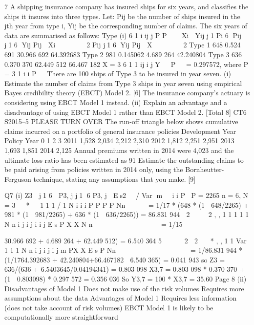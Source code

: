 \documentclass[a4paper,12pt]{article}
\begin{document}
\begin{enumerate}
7 A shipping insurance company has insured ships for six years, and classifies the
ships it insures into three types.
Let:
  Pij be the number of ships insured in the jth year from type i,
Yij be the corresponding number of claims.
The six years of data are summarised as follows:
  Type (i)
6
1
i ij
j
P P

  Xi 
Yij
j1 Pi
6
Pij
j1
6
Yij
Pij
 Xi






2
Pij
j1
6
Yij
Pij
 X






2
Type 1 648 0.524 691 30.966 692 64.392683
Type 2 981 0.145062 4.689 264 42.240804
Type 3 636 0.370 370 62.449 512 66.467 182
X =
  3 6
1 1
ij
i j
Y
  P
  = 0.297572, where P =
  3
1
i
i
P
 
There are 100 ships of Type 3 to be insured in year seven.
(i) Estimate the number of claims from Type 3 ships in year seven using
empirical Bayes credibility theory (EBCT) Model 2. [6]
The insurance company’s actuary is considering using EBCT Model 1 instead.
(ii) Explain an advantage and a disadvantage of using EBCT Model 1 rather
than EBCT Model 2. 
[Total 8]
CT6 S2015–5 PLEASE TURN OVER
 The run-off triangle below shows cumulative claims incurred on a portfolio of
general insurance policies
Development Year
Policy Year 0 1 2 3
2011 1,528 2,034 2,212 2,310
2012 1,812 2,251 2,951
2013 1,693 1,851
2014 2,125
Annual premiums written in 2014 were 4,023 and the ultimate loss ratio has been
estimated as 91%
Estimate the outstanding claims to be paid arising from policies written in 2014
only, using the Bornheutter-Ferguson technique, stating any assumptions that you
make. [9]


\newpage
Q7 (i) Z3  j1
6  P3, j
j1
6 P3, j  Es2 / Var m
i
i
P P = 2265
n = 6, N = 3
  *  
1
1 1 /
  1
N
i i
i
P P P P
Nn 
 
 
= 1/17 * (648 * (1  648/2265) + 981 * (1  981/2265) + 636 *
            (1  636/2265))
= 86.831 944
 2    2
, ,
1 1
1 1
1
N n
i j i j i
i j
E s P X X
N n  
         
 
= 1/15{30.966 692 + 4.689 264 + 62.449 512) = 6.540 364 5
    2  2  
* , ,
1 1
Var 1 1
1
N n
i j i j
i j
m PX X E s
P Nn  
           

= 1/86.831 944 * (1/17{64.392683 + 42.240804+66.467182}  6.540 365)
= 0.041 943
so Z3 = 636/(636 + 6.5403645/0.04194341) = 0.803 098
X3,7 = 0.803 098 * 0.370 370 + (1  0.803098) * 0.297 572 = 0.356 036
So Y3,7 = 100 * X3,7 = 35.60
Page 8
(ii) Disadvantages of Model 1
Does not make use of the risk volumes
Requires more assumptions about the data
Advantages of Model 1
Requires less information (does not take account of risk volumes)
EBCT Model 1 is likely to be computationally more straightforward


}
\end{enumerate}
\end{document}
